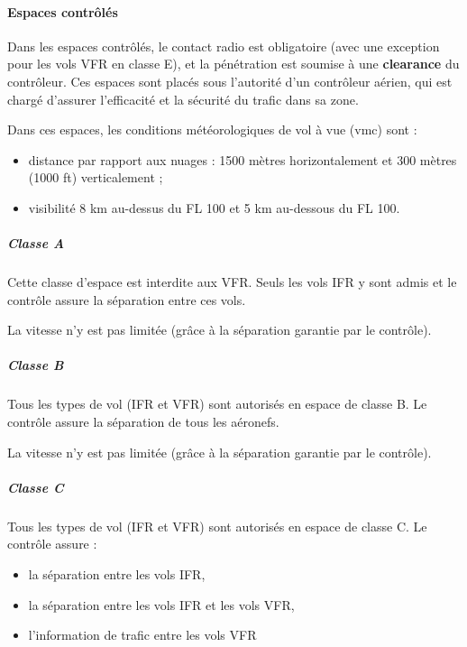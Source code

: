 		\paragraph{Espaces contrôlés}
		Dans les espaces contrôlés, le contact radio est obligatoire (avec une exception pour les vols VFR en classe E), et la pénétration est soumise à une \textbf{clearance} du contrôleur. Ces espaces sont placés sous l'autorité d'un contrôleur aérien, qui est chargé d'assurer l'efficacité et la sécurité du trafic dans sa zone.
		
		Dans ces espaces, les conditions météorologiques de vol à vue (\acrshort{vmc}) sont :
		\begin{itemize}
		\item distance par rapport aux nuages : 1500 mètres horizontalement et 300 mètres (1000 ft) verticalement ;
		\item visibilité 8 km au-dessus du FL 100 et 5 km au-dessous du FL 100. 
		\end{itemize}
		
		\subparagraph{Classe A}
		Cette classe d'espace est interdite aux VFR. Seuls les vols IFR y sont admis et le contrôle assure la séparation entre ces vols.
		
		
		La vitesse n'y est pas limitée (grâce à la séparation garantie par le contrôle).
		
		\subparagraph{Classe B}
		Tous les types de vol (IFR et VFR) sont autorisés en espace de classe B. Le contrôle assure la séparation de tous les aéronefs.
		
		
		La vitesse n'y est pas limitée (grâce à la séparation garantie par le contrôle).
		
		\subparagraph{Classe C}
		Tous les types de vol (IFR et VFR) sont autorisés en espace de classe C. Le contrôle assure :
		\begin{itemize}
		\item la séparation entre les vols IFR,
		\item la séparation entre les vols IFR et les vols VFR,
		\item l'information de trafic entre les vols VFR
		\end{itemize}
		
		
